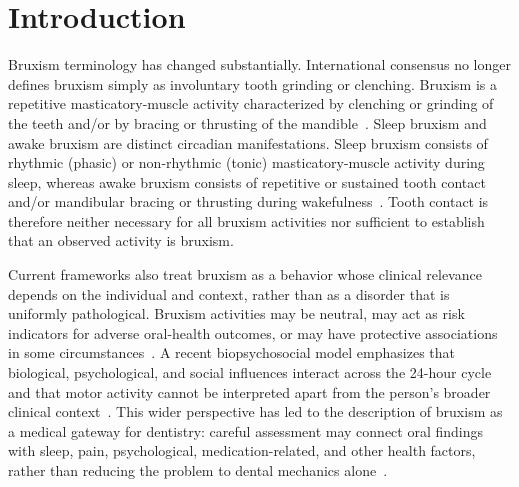 \documentclass[pdflatex,sn-nature,iicol]{sn-jnl}
\begin{document}

\maketitle

\section{Introduction}

Bruxism terminology has changed substantially. International consensus no longer defines bruxism simply as involuntary tooth grinding or clenching. Bruxism is a repetitive masticatory-muscle activity characterized by clenching or grinding of the teeth and/or by bracing or thrusting of the mandible~\cite{lobbezoo2018international,verhoeff2025definitions}. Sleep bruxism and awake bruxism are distinct circadian manifestations. Sleep bruxism consists of rhythmic (phasic) or non-rhythmic (tonic) masticatory-muscle activity during sleep, whereas awake bruxism consists of repetitive or sustained tooth contact and/or mandibular bracing or thrusting during wakefulness~\cite{verhoeff2025definitions}. Tooth contact is therefore neither necessary for all bruxism activities nor sufficient to establish that an observed activity is bruxism.

Current frameworks also treat bruxism as a behavior whose clinical relevance depends on the individual and context, rather than as a disorder that is uniformly pathological. Bruxism activities may be neutral, may act as risk indicators for adverse oral-health outcomes, or may have protective associations in some circumstances~\cite{lobbezoo2018international,verhoeff2025definitions}. A recent biopsychosocial model emphasizes that biological, psychological, and social influences interact across the 24-hour cycle and that motor activity cannot be interpreted apart from the person's broader clinical context~\cite{manfredini2026biopsychosocial}. This wider perspective has led to the description of bruxism as a medical gateway for dentistry: careful assessment may connect oral findings with sleep, pain, psychological, medication-related, and other health factors, rather than reducing the problem to dental mechanics alone~\cite{manfredini2024evolution}.
\end{document}
